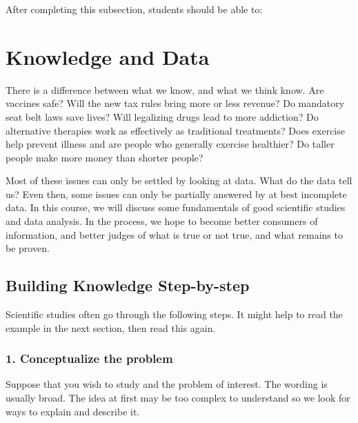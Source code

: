 \documentclass[11pt, chapterprefix=true]{scrbook}\usepackage[]{graphicx}\usepackage[]{color}
\begin{document}
After completing this subsection, students should be able to:


\section{Knowledge and Data}

There is a difference between what we know, and what we think know.  Are vaccines safe?  Will the new tax rules bring more or less revenue?  Do mandatory seat belt laws save lives?   Will legalizing drugs lead to more addiction?  Do alternative therapies work as effectively as traditional treatments?  Does exercise help prevent illness and are people who generally exercise healthier? Do taller people make more money than shorter people?  \citep{naranjo2018}

Most of these issues can only be settled by looking at data.  What do the data tell us?  Even then, some issues can only be partially answered by at best incomplete data.  In this course, we will discuss some fundamentals of good scientific studies
and data analysis.  In the process, we hope to become better consumers of
information, and better judges of what is true or not true, and what remains to be proven.

\subsection{Building Knowledge Step-by-step}

Scientific studies often go through the following steps.  It might help to read the example in the next section, then read this again.

\subsubsection{1. Conceptualize the problem} 

Suppose that you wish to study and the problem of interest.  The wording is usually broad. The idea at first may be too complex to understand so we look for ways to explain and describe it.
\end{document}
